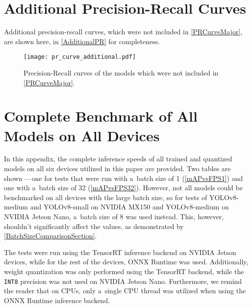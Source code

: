 \begin{appendices}
\label{Appendix} %


\chapter{Additional Precision-Recall Curves}
\label{PRCurvesAdditional}
Additional precision-recall curves, which were not included in
\autoref{PRCurveMajor}, are shown here, in \autoref{AdditionalPR} for completeness.
\begin{figure}[H]
        \centering
        \texttt{[image: pr\_curve\_additional.pdf]}
        \caption{Precision-Recall curves of the models which were not included
        in \autoref{PRCurveMajor}.}
        \label{AdditionalPR}
\end{figure}






\chapter{Complete Benchmark of All Models on All Devices}
\label{mAPvsFPS}

In this appendix, the complete inference speeds of all trained and quantized
models on all six devices utilized in this paper are provided. Two tables are
shown\,---\,one for tests that were run with a~batch size of 1
(\autoref{mAPvsFPS1}) and one with a~batch size of 32 (\autoref{mAPvsFPS32}).
However, not all models could be benchmarked on all devices with the large batch
size, so for tests of YOLOv8-medium and YOLOv8-small on NVIDIA MX150 and
YOLOv8-medium on NVIDIA Jetson Nano, a~batch size of 8 was used instead. This,
however, shouldn't significantly affect the values, as demonstrated by
\autoref{BatchSizeComparisonSection}.

The tests were run using the TensorRT inference backend on NVIDIA Jetson
devices, while for the rest of the devices, ONNX Runtime was used. Additionally,
weight quantization was only performed using the TensorRT backend, while the
\texttt{INT8} precision was not used on NVIDIA Jetson Nano. Furthermore, we
remind the reader that on CPUs, only a~single CPU thread was utilized when using
the ONNX Runtime inference backend.


\end{appendices}
